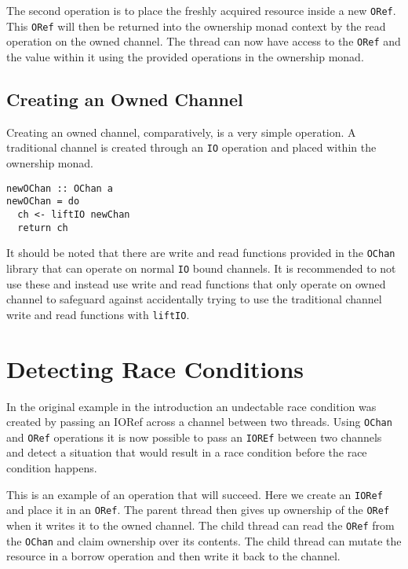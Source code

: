 \documentclass[onehalf,11pt]{beavtex}
\begin{document}
The second operation is to place the freshly acquired resource inside a new
\texttt{ORef}.  This \texttt{ORef} will then be returned into the
ownership monad context by the read operation on the
owned channel.  The thread can now have access to the \texttt{ORef}
and the value within it using the provided operations in the
ownership monad.


\subsection{Creating an Owned Channel}

Creating an owned channel, comparatively, is a very simple operation.
A traditional channel is created through an \texttt{IO} operation and placed
within the ownership monad.

\begin{verbatim}
newOChan :: OChan a
newOChan = do
  ch <- liftIO newChan
  return ch
\end{verbatim}

It should be noted that there are write and read functions provided
in the \texttt{OChan} library that can operate on normal \texttt{IO} bound
channels.  It is recommended to not use these and instead use write and read
functions that only operate on owned channel to safeguard against
accidentally trying to use the traditional channel write and read functions
with \texttt{liftIO}.

\section{Detecting Race Conditions}

In the original example in the introduction an undectable race condition was
created by passing an IORef across a channel between two threads.
Using \texttt{OChan} and \texttt{ORef} operations it is now possible
to pass an \texttt{IOREf} between two channels and detect a situation
that would result in a race condition before the race condition happens.

This is an example of an operation that will succeed. Here we create an
\texttt{IORef} and place it in an \texttt{ORef}. The parent thread
then gives up ownership of the \texttt{ORef} when it writes it to the
owned channel. The child thread can read the \texttt{ORef} from the
\texttt{OChan} and claim ownership over its contents. The child thread
can mutate the resource in a borrow operation and then write it back to
the channel. 
\end{document}
